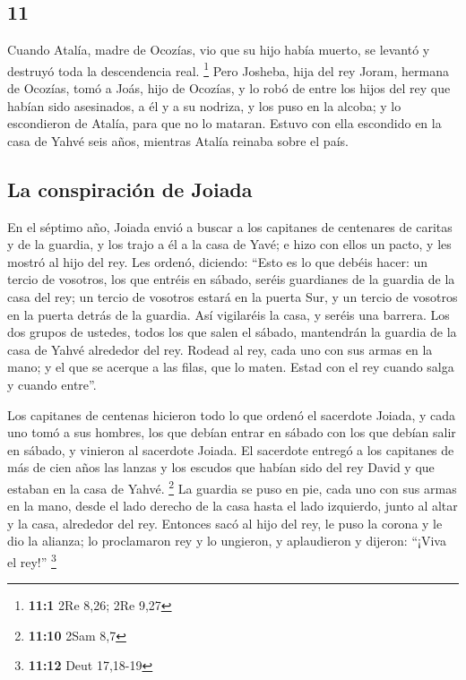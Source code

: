 \begin{paracol}{2}
\hypertarget{section-20}{%
\section{11}\label{section-20}}

 Cuando Atalía, madre de Ocozías, vio que su hijo había
muerto, se levantó y destruyó toda la descendencia real. \footnote{\textbf{11:1}
  2Re 8,26; 2Re 9,27}  Pero Josheba, hija del rey Joram,
hermana de Ocozías, tomó a Joás, hijo de Ocozías, y lo robó de entre los
hijos del rey que habían sido asesinados, a él y a su nodriza, y los
puso en la alcoba; y lo escondieron de Atalía, para que no lo mataran.
 Estuvo con ella escondido en la casa de Yahvé seis años,
mientras Atalía reinaba sobre el país.

\hypertarget{la-conspiraciuxf3n-de-joiada}{%
\subsection{La conspiración de
Joiada}\label{la-conspiraciuxf3n-de-joiada}}

 En el séptimo año, Joiada envió a buscar a los capitanes
de centenares de caritas y de la guardia, y los trajo a él a la casa de
Yavé; e hizo con ellos un pacto, y les mostró al hijo del rey.
 Les ordenó, diciendo: ``Esto es lo que debéis hacer: un
tercio de vosotros, los que entréis en sábado, seréis guardianes de la
guardia de la casa del rey;  un tercio de vosotros estará
en la puerta Sur, y un tercio de vosotros en la puerta detrás de la
guardia. Así vigilaréis la casa, y seréis una barrera. 
Los dos grupos de ustedes, todos los que salen el sábado, mantendrán la
guardia de la casa de Yahvé alrededor del rey.  Rodead al
rey, cada uno con sus armas en la mano; y el que se acerque a las filas,
que lo maten. Estad con el rey cuando salga y cuando entre''.

 Los capitanes de centenas hicieron todo lo que ordenó el
sacerdote Joiada, y cada uno tomó a sus hombres, los que debían entrar
en sábado con los que debían salir en sábado, y vinieron al sacerdote
Joiada.  El sacerdote entregó a los capitanes de más de
cien años las lanzas y los escudos que habían sido del rey David y que
estaban en la casa de Yahvé. \footnote{\textbf{11:10} 2Sam 8,7}
 La guardia se puso en pie, cada uno con sus armas en la
mano, desde el lado derecho de la casa hasta el lado izquierdo, junto al
altar y la casa, alrededor del rey.  Entonces sacó al
hijo del rey, le puso la corona y le dio la alianza; lo proclamaron rey
y lo ungieron, y aplaudieron y dijeron: ``¡Viva el rey!'' \footnote{\textbf{11:12}
  Deut 17,18-19}


\end{paracol}
